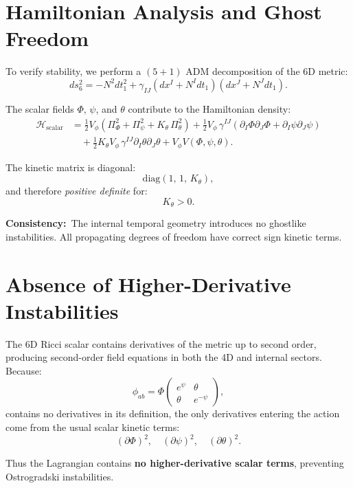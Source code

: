 \documentclass[12pt]{article}
\begin{document}

\newpage
\section{Hamiltonian Analysis and Ghost Freedom}

To verify stability, we perform a \((5+1)\) ADM decomposition of the 6D metric:
\[
ds^2_6
=
-N^2 dt_1^2
+ \gamma_{IJ}(dx^I + N^I dt_1)(dx^J + N^J dt_1).
\]

The scalar fields \(\Phi\), \(\psi\), and \(\theta\) contribute to the Hamiltonian
density:
\begin{align}
\mathcal{H}_{\text{scalar}}
&=
\frac{1}{2}V_\phi
\left(
\Pi_\Phi^2 + \Pi_\psi^2
+ K_\theta\, \Pi_\theta^2
\right)
+
\frac{1}{2}V_\phi\, \gamma^{IJ}
\left(
\partial_I \Phi \partial_J \Phi
+ 
\partial_I \psi \partial_J \psi
\right)
\nonumber\\
&\quad
+
\frac{1}{2}K_\theta V_\phi\, \gamma^{IJ}
\partial_I \theta \partial_J \theta
+ V_\phi V(\Phi,\psi,\theta).
\end{align}

The kinetic matrix is diagonal:
\[
\text{diag}(1,\,1,\,K_\theta),
\]
and therefore \emph{positive definite} for:
\[
K_\theta > 0.
\]

\noindent\textbf{Consistency:}\
The internal temporal geometry introduces no ghostlike instabilities.
All propagating degrees of freedom have correct sign kinetic terms.


\newpage
\section{Absence of Higher-Derivative Instabilities}

The 6D Ricci scalar contains derivatives of the metric up to second order,
producing second-order field equations in both the 4D and internal sectors.
Because:
\[
\phi_{ab} = \Phi
\begin{pmatrix}
e^\psi & \theta \\
\theta & e^{-\psi}
\end{pmatrix},
\]
contains no derivatives in its definition, the only derivatives entering the
action come from the usual scalar kinetic terms:
\[
(\partial\Phi)^2, \quad (\partial\psi)^2, \quad (\partial\theta)^2.
\]

Thus the Lagrangian contains \textbf{no higher-derivative scalar terms}, preventing
Ostrogradski instabilities.
\end{document}
